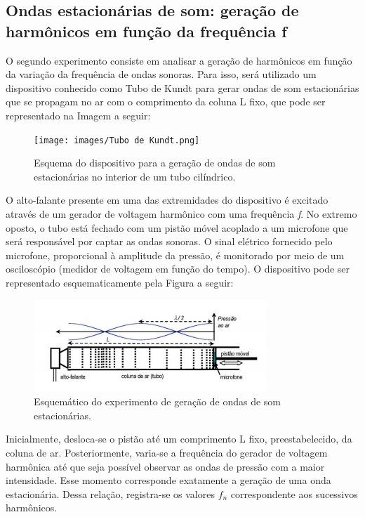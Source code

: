 \subsection{Ondas estacionárias de som: geração de harmônicos
em função da frequência f}

O segundo experimento consiste em analisar a geração de harmônicos em função da variação da frequência de ondas sonoras. Para isso, será utilizado um dispositivo conhecido como Tubo de Kundt para gerar ondas de som estacionárias que se propagam no ar com o comprimento da coluna L fixo, que pode ser representado na Imagem a seguir:

\begin{figure}[H]
  \centering
  \texttt{[image: images/Tubo de Kundt.png]}
  \caption{ Esquema do dispositivo para a geração de ondas de som estacionárias no interior de um tubo cilíndrico.}
\end{figure}

O alto-falante presente em uma das extremidades do dispositivo é excitado através de um gerador de voltagem harmônico com uma frequência \textit{f}. No extremo oposto, o tubo está fechado com um pistão móvel acoplado a um microfone que será responsável por captar as ondas sonoras. O sinal elétrico fornecido pelo microfone, proporcional à amplitude da pressão, é monitorado por meio de um osciloscópio (medidor de voltagem em função do tempo). O dispositivo pode ser representado esquematicamente pela Figura a seguir:

\begin{figure}[H]
  \centering
  \includegraphics[scale=1.15]{images/esquemático tubo de Kundt.png}
  \caption{ Esquemático do experimento de geração de ondas de som estacionárias.}
\end{figure}

Inicialmente, desloca-se o pistão até um comprimento L fixo, preestabelecido, da coluna de ar. Posteriormente, varia-se a frequência do gerador de voltagem harmônica até que seja possível observar as ondas de pressão com a maior intensidade. Esse momento corresponde exatamente a geração de uma onda estacionária. Dessa relação, registra-se os valores \textit{$f_n$} correspondente aos sucessivos harmônicos.

